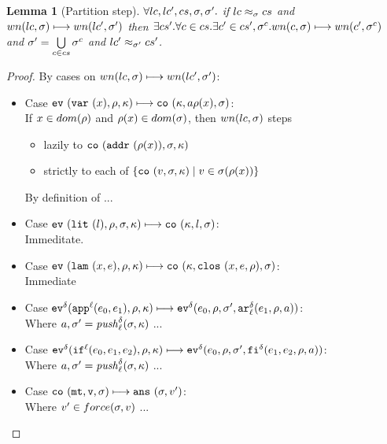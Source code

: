 \documentclass[preprint,onecolumn,9pt]{sigplanconf} %
\newtheorem{lemma}{Lemma}
\begin{document}
\begin{lemma}[Partition step]
$\forall lc, lc', cs, \msto, \msto'.$ if $\lapprx{lc}{\msto}{cs}$ and $wn(lc,\msto) \machstep wn(lc', \msto')$ then
$\exists cs'. \forall c \in cs. \exists c' \in cs', \msto^c. wn(c,\msto) \machstep wn(c', \msto^c)$ and $\msto' = \bigcup\limits_{c \in cs}{\msto^c}$ and $\lapprx{lc'}{\msto'}{cs'}$.
\end{lemma}
\begin{proof}
By cases on $wn(lc,\msto) \machstep wn(lc', \msto')$:
\begin{itemize}
\item{Case $\ev{\svar{\mvar}, \menv, \mkont} \machstep
            \co{\mkont, \maddr{\menv(\mvar)}, \msto}$: \\
      If $\mvar \in dom(\menv)$ and $\menv(x) \in dom(\msto)$, then $wn(lc, \msto)$ steps
      \begin{itemize} 
       \item{lazily to $\co{\saddr{\menv(\mvar)}, \msto, \mkont}$}
       \item{strictly to each of $\{\co{\mval, \msto, \mkont} \mid \mval \in \msto(\menv(\mvar))\}$}
      \end{itemize}
      By definition of ...}
\item{Case $\ev{\slit{\mlit}, \menv, \msto, \mkont} \machstep
            \co{\mkont, \mlit, \msto}$: \\
      Immeditate.}
\item{Case $\ev{\slam{\mvar}{\mexp}, \menv, \mkont} \machstep
            \co{\mkont, \clos{\mvar, \mexp, \menv}, \msto}$: \\
      Immediate}
\item{Case $\ev[^\mcntr]{\sapp[^\mlab]{\mexp_0}{\mexp_1}, \menv, \mkont} \machstep
            \ev[^\mcntr]{\mexp_0, \menv, \msto', \kar[^\mcntr_\mlab]{\mexp_1, \menv, \maddr}}$: \\
      Where $a, \msto' = \mathit{push}_\mlab^\mcntr(\msto,\mkont)$
      ...}
\item{Case $\ev[^\mcntr]{\sif[^\mlab]{\mexp_0}{\mexp_1}{\mexp_2}, \menv, \mkont} \machstep
            \ev[^\mcntr]{\mexp_0, \menv, \msto', \kif[^\mcntr]{\mexp_1, \mexp_2, \menv, \maddr}}$: \\
      Where $a, \msto' = \mathit{push}_\mlab^\mcntr(\msto,\mkont)$            
      ...}
\item{Case $\co{\kmt, \mval, \msto} \machstep \ans{\msto, \mval'}$: \\
      Where $\mval' \in force(\msto, \mval)$
      ...}

\end{itemize}
\end{proof}
\end{document}
